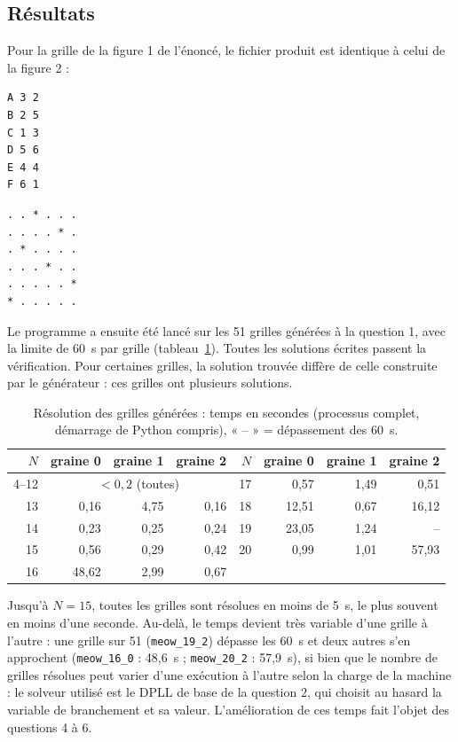 \documentclass[11pt,a4paper]{article}
\begin{document}
\subsection{Résultats}

Pour la grille de la figure 1 de l'énoncé, le fichier produit est identique à celui de la
figure 2 :
\begin{center}
\begin{minipage}{0.3\textwidth}\small
\begin{verbatim}
A 3 2
B 2 5
C 1 3
D 5 6
E 4 4
F 6 1
\end{verbatim}
\end{minipage}
\begin{minipage}{0.3\textwidth}\small
\begin{verbatim}
. . * . . .
. . . . * .
. * . . . .
. . . * . .
. . . . . *
* . . . . .
\end{verbatim}
\end{minipage}
\end{center}

Le programme a ensuite été lancé sur les 51 grilles générées à la question 1, avec la limite de
60~s par grille (tableau~\ref{tab:q3}). Toutes les solutions écrites passent la vérification.
Pour certaines grilles, la solution trouvée diffère de celle construite par le générateur : ces
grilles ont plusieurs solutions.

\begin{table}[h]
  \centering\small
  \begin{tabular}{rrrr@{\qquad}rrrr}
    \toprule
    $N$ & graine 0 & graine 1 & graine 2 & $N$ & graine 0 & graine 1 & graine 2\\
    \midrule
    4--12 & \multicolumn{3}{c}{$< 0{,}2$ (toutes)} & 17 & 0,57 & 1,49 & 0,51\\
    13 & 0,16 & 4,75 & 0,16  & 18 & 12,51 & 0,67 & 16,12\\
    14 & 0,23 & 0,25 & 0,24  & 19 & 23,05 & 1,24 & --\\
    15 & 0,56 & 0,29 & 0,42  & 20 & 0,99 & 1,01 & 57,93\\
    16 & 48,62 & 2,99 & 0,67 &    &      &      &   \\
    \bottomrule
  \end{tabular}
  \caption{Résolution des grilles générées : temps en secondes (processus complet, démarrage de
  Python compris), « -- » = dépassement des 60~s.}
  \label{tab:q3}
\end{table}

Jusqu'à $N=15$, toutes les grilles sont résolues en moins de 5~s, le plus souvent en moins d'une
seconde. Au-delà, le temps devient très variable d'une grille à l'autre : une grille sur 51
(\texttt{meow\_19\_2}) dépasse les 60~s et deux autres s'en approchent (\texttt{meow\_16\_0} :
48,6~s ; \texttt{meow\_20\_2} : 57,9~s), si bien que le nombre de grilles résolues peut varier
d'une exécution à l'autre selon la charge de la machine : le solveur utilisé est le DPLL de base de la
question 2, qui choisit au hasard la variable de branchement et sa valeur. L'amélioration de ces
temps fait l'objet des questions 4 à 6.
\end{document}
